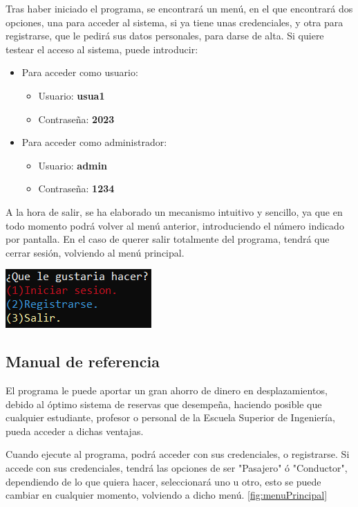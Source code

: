 Tras haber iniciado el programa, se encontrará un menú, en el que encontrará dos opciones, una para acceder al sistema, si ya tiene unas credenciales, y otra para registrarse,
que le pedirá sus datos personales, para darse de alta. Si quiere testear el acceso al sistema, puede introducir:
\begin{itemize}
  \item Para acceder como usuario:
  \begin{itemize}
    \item Usuario: \textbf{usua1}
    \item Contraseña: \textbf{2023}
  \end{itemize}
  \item Para acceder como administrador:
  \begin{itemize}
    \item Usuario: \textbf{admin}
    \item Contraseña: \textbf{1234}
  \end{itemize}
\end{itemize}

A la hora de salir, se ha elaborado un mecanismo intuitivo y sencillo, ya que en todo momento podrá volver al menú anterior, introduciendo el número indicado por pantalla.
En el caso de querer salir totalmente del programa, tendrá que cerrar sesión, volviendo al menú principal.
\begin{center}
  \includegraphics[]{FOTOS/menuPrincipal.png}
  \label{fig:menuPrincipal}
\end{center}

\subsection{Manual de referencia}

El programa le puede aportar un gran ahorro de dinero en desplazamientos, debido al óptimo sistema de reservas que desempeña, haciendo posible que cualquier estudiante, profesor o personal
de la Escuela Superior de Ingeniería, pueda acceder a dichas ventajas.

\bigskip

Cuando ejecute al programa, podrá acceder con sus credenciales, o registrarse. Si accede con sus credenciales, tendrá las opciones de ser "Pasajero" ó "Conductor", 
dependiendo de lo que quiera hacer, seleccionará uno u otro, esto se puede cambiar en cualquier momento, volviendo a dicho menú. \ref{fig:menuPrincipal}

